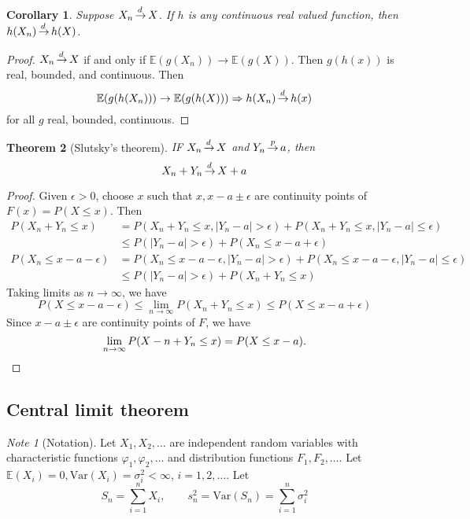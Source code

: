 \documentclass[10pt, oneside, reqno]{amsart}
\theoremstyle{plain}%
\newtheorem{thm}{Theorem}[section]
\newtheorem{cor}[thm]{Corollary}
\theoremstyle{definition}
\theoremstyle{remark}
\newtheorem*{note}{Note}
\newcommand{\var}{\text{Var}}
\renewcommand{\phi}{\varphi}
\newcommand{\E}{\mathbb{E}}
\def\cip{\,{\buildrel p \over \rightarrow}\,}
\def\cid{\,{\buildrel \!d \over \rightarrow}\,}
\begin{document}
\begin{cor}
    Suppose $X_n \cid X$.  If $h$ is any continuous real valued function, then $h(X_n) \cid h(X)$.
\end{cor}
\begin{proof}
    $X_n \cid X$ if and only if $\E(g(X_n)) \rightarrow \E(g(X))$.  Then $g(h(x))$ is real, bounded, and continuous.  Then \[
        \E(g(h(X_n))) \rightarrow \E(g(h(X))) \Rightarrow h(X_n) \cid h(x)
    \] for all $g$ real, bounded, continuous.
\end{proof}

\begin{thm}[Slutsky's theorem]
    IF $X_n \cid X$ and $Y_n \cip a$, then \[
        X_n + Y_n \cid X + a
    \]
\end{thm}
\begin{proof}
    Given $\epsilon > 0$, choose $x$ such that $x, x - a \pm \epsilon$ are continuity points of $F(x) = P(X \leq x)$.  Then \begin{align*}
        P(X_n + Y_n \leq x) &= P(X_n + Y_n \leq x, |Y_n - a | > \epsilon) + P(X_n + Y_n \leq x, |Y_n - a| \leq \epsilon)        \\
        &\leq P(|Y_n - a | > \epsilon) + P(X_n \leq x - a + \epsilon) \\
        P(X_n \leq x - a - \epsilon) &= P(X_n \leq x - a - \epsilon, |Y_n - a| > \epsilon) + P(X_n \leq x - a - \epsilon, |Y_n - a | \leq \epsilon) \\
        &\leq P(|Y_n - a| > \epsilon) + P(X_n + Y_n \leq x)
    \end{align*}  Taking limits as $n \rightarrow \infty$, we have \[
        P(X \leq x - a - \epsilon) \leq \lim_{n \rightarrow \infty} P(X_n + Y_n \leq x) \leq P(X \leq x - a + \epsilon)  
    \]  Since $x - a \pm \epsilon$ are continuity points of $F$, we have \[
        \lim_{n \rightarrow \infty} P(X-n + Y_n \leq x) = P(X \leq x - a).\qedhere
    \]
\end{proof}
\subsection{Central limit theorem} %
\label{sub:central_limit_theorem}

\begin{note}[Notation]
    Let $X_1, X_2, \dots$ are independent random variables with characteristic functions $\phi_1, \phi_2, \dots$ and distribution functions $F_1, F_2, \dots$.  Let $\E(X_i) = 0, \var(X_i) = \sigma_i^2 < \infty$, $i = 1, 2, \dots$.  Let \[
        S_n = \sum_{i=1}^n X_i, \qquad s_n^2 = \var(S_n) = \sum_{i=1}^n \sigma_i^2
    \] 
\end{note}
\end{document}
